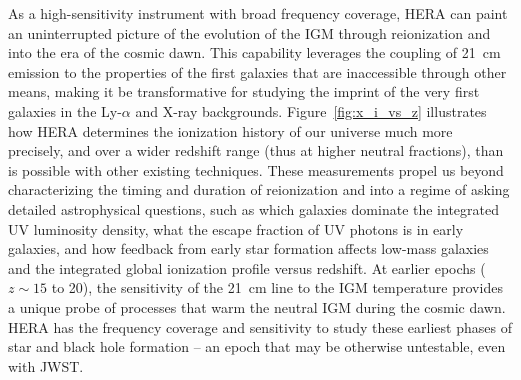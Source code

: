 \documentclass[preprint]{aastex}
\newcommand{\compress}{\vspace{-0.3in}}
\begin{document}
As a high-sensitivity instrument with broad frequency coverage, HERA can
paint an uninterrupted picture of the evolution of the IGM through reionization and into the era of the cosmic dawn.
This capability leverages the coupling of
21~cm emission to the properties of the first galaxies that
are inaccessible through other means, making it be transformative for
studying the imprint of the very first galaxies in the Ly-$\alpha$ and X-ray backgrounds.
Figure~\ref{fig:x_i_vs_z} illustrates how HERA
determines the ionization history of our universe much more precisely,
and over a wider redshift range (thus at higher neutral fractions), than is possible with other existing techniques.
These measurements propel us beyond characterizing the timing and duration of reionization and into a regime
of asking detailed astrophysical questions, such as which galaxies dominate the integrated UV luminosity density, what the escape fraction
of UV photons is in early galaxies, and how feedback from early star formation affects low-mass galaxies and
the integrated  global ionization profile versus redshift.
At earlier epochs ($z \sim 15$ to 20), the sensitivity of the 21~cm line
to the IGM temperature provides a unique probe of processes that warm the neutral IGM during the cosmic dawn.
HERA has the frequency coverage and
sensitivity to study these earliest phases of star and black hole formation -- an epoch that may be otherwise
untestable, even with JWST.

\end{document}
